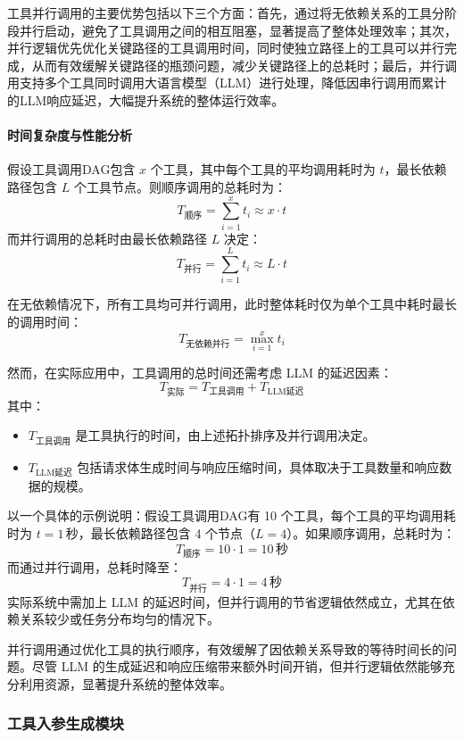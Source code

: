 工具并行调用的主要优势包括以下三个方面：首先，通过将无依赖关系的工具分阶段并行启动，避免了工具调用之间的相互阻塞，显著提高了整体处理效率；其次，并行逻辑优先优化关键路径的工具调用时间，同时使独立路径上的工具可以并行完成，从而有效缓解关键路径的瓶颈问题，减少关键路径上的总耗时；最后，并行调用支持多个工具同时调用大语言模型（LLM）进行处理，降低因串行调用而累计的LLM响应延迟，大幅提升系统的整体运行效率。

\paragraph{时间复杂度与性能分析}

假设工具调用DAG包含 \(x\) 个工具，其中每个工具的平均调用耗时为 \(t\)，最长依赖路径包含 \(L\) 个工具节点。则顺序调用的总耗时为：
\[
T_{\text{顺序}} = \sum_{i=1}^{x} t_i \approx x \cdot t
\]
而并行调用的总耗时由最长依赖路径 \(L\) 决定：
\[
T_{\text{并行}} = \sum_{i=1}^{L} t_i \approx L \cdot t
\]

在无依赖情况下，所有工具均可并行调用，此时整体耗时仅为单个工具中耗时最长的调用时间：
\[
T_{\text{无依赖并行}} = \max_{i=1}^{x} t_i
\]

然而，在实际应用中，工具调用的总时间还需考虑 LLM 的延迟因素：
\[
T_{\text{实际}} = T_{\text{工具调用}} + T_{\text{LLM延迟}}
\]
其中：
\begin{itemize}
    \item \(T_{\text{工具调用}}\) 是工具执行的时间，由上述拓扑排序及并行调用决定。
    \item \(T_{\text{LLM延迟}}\) 包括请求体生成时间与响应压缩时间，具体取决于工具数量和响应数据的规模。
\end{itemize}

以一个具体的示例说明：假设工具调用DAG有 10 个工具，每个工具的平均调用耗时为 \(t = 1 \, \text{秒}\)，最长依赖路径包含 4 个节点（\(L = 4\)）。如果顺序调用，总耗时为：
\[
T_{\text{顺序}} = 10 \cdot 1 = 10 \, \text{秒}
\]
而通过并行调用，总耗时降至：
\[
T_{\text{并行}} = 4 \cdot 1 = 4 \, \text{秒}
\]
实际系统中需加上 LLM 的延迟时间，但并行调用的节省逻辑依然成立，尤其在依赖关系较少或任务分布均匀的情况下。

并行调用通过优化工具的执行顺序，有效缓解了因依赖关系导致的等待时间长的问题。尽管 LLM 的生成延迟和响应压缩带来额外时间开销，但并行逻辑依然能够充分利用资源，显著提升系统的整体效率。

\subsubsection{工具入参生成模块}


